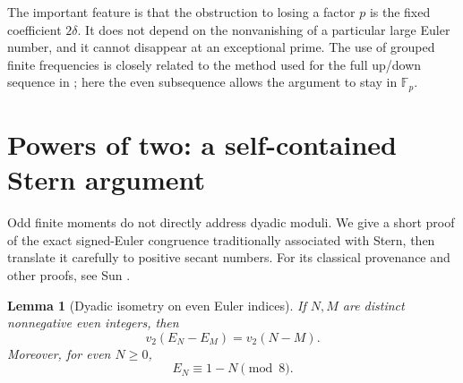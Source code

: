 \documentclass[11pt,a4paper]{article}
\numberwithin{equation}{section}
\newtheorem{lemma}[theorem]{Lemma}
\theoremstyle{definition}
\newcommand{\F}{\mathbb F}
\begin{document}
The important feature is that the obstruction to losing a factor $p$
is the fixed coefficient $2\delta$. It does not depend on the
nonvanishing of a particular large Euler number, and it cannot disappear
at an exceptional prime. The use of grouped finite frequencies is closely
related to the method used for the full up/down sequence in \cite{gulec};
here the even subsequence allows the argument to stay in $\F_p$.

\section{Powers of two: a self-contained Stern argument}
\label{sec:two}

Odd finite moments do not directly address dyadic moduli. We give a short
proof of the exact signed-Euler congruence traditionally associated with
Stern, then translate it carefully to positive secant numbers. For its
classical provenance and other proofs, see Sun \cite{sun}.

\begin{lemma}[Dyadic isometry on even Euler indices]\label{lem:stern}
If $N,M$ are distinct nonnegative even integers, then
\begin{equation}\label{eq:stern}
v_2(E_N-E_M)=v_2(N-M).
\end{equation}
Moreover, for even $N\ge0$,
\begin{equation}\label{eq:Emod8}
E_N\equiv1-N\pmod8.
\end{equation}
\end{lemma}
\end{document}

